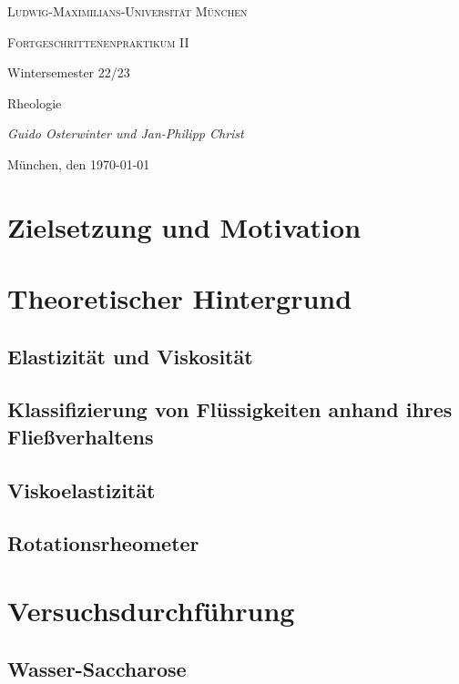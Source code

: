 \documentclass[11pt,a4paper,oneside]{scrartcl}
\begin{document}
\begin{titlepage}
	\centering
	{\scshape\LARGE Ludwig-Maximilians-Universität \linebreak München \par}
	\vspace{1cm}
	{\scshape\Large Fortgeschrittenenpraktikum II \par Wintersemester 22/23 \par}
	\vspace{1.5cm}
	{\huge\bfseries \par  Rheologie\par}
	\vspace{2cm}
	{\Large\itshape Guido Osterwinter und Jan-Philipp Christ \par}
	\vfill
	{\large München, den \today\par}
\end{titlepage}

\tableofcontents
\newpage
\section{Zielsetzung und Motivation}

\section{Theoretischer Hintergrund}
\subsection{Elastizität und Viskosität}
\subsection{Klassifizierung von Flüssigkeiten anhand ihres Fließverhaltens}
\subsection{Viskoelastizität}
\subsection{Rotationsrheometer}
\section{Versuchsdurchführung}
\subsection{Wasser-Saccharose}
\end{document}
